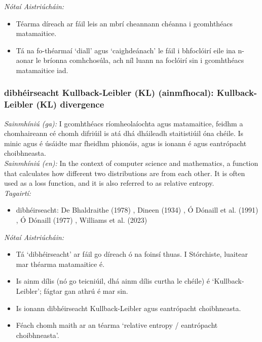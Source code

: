  \noindent \textit{Nótaí Aistriúcháin:}
\begin{itemize}
	\item Téarma díreach ar fáil leis an mbrí cheannann chéanna i gcomhthéacs matamaitice.
	\item Tá na fo-théarmaí `diall' agus `caighdeánach' le fáil i bhfoclóirí eile ina n-aonar le bríonna comhchosúla, ach níl luann na foclóirí sin i gcomhthéacs matamaitice iad.
\end{itemize}


\subsubsection*{dibhéirseacht Kullback-Leibler (KL) (ainmfhocal): Kullback-Leibler (KL) divergence}
 \noindent \textit{Sainmhíniú (ga):} I gcomhthéacs ríomheolaíochta agus matamaitice, feidhm a chomhaireann cé chomh difriúil is atá dhá dháileadh staitistiúil óna chéile. Is minic agus é úsáidte mar fheidhm phionóis, agus is ionann é agus eantrópacht choibhneasta.
\\
 \noindent \textit{Sainmhíniú (en):} In the context of computer science and mathematics, a function that calculates how different two distributions are from each other. It is often used as a loss function, and it is also referred to as relative entropy.
\\
 \noindent \textit{Tagairtí:}
\begin{itemize}
	\item dibhéirseacht: De Bhaldraithe (1978) \cite{de-bhaldraithe}, Dineen (1934) \cite{dineen}, Ó Dónaill et al. (1991) \cite{focloir-beag}, Ó Dónaill (1977) \cite{odonaill}, Williams et al. (2023) \cite{storchiste}
\end{itemize}

 \noindent \textit{Nótaí Aistriúcháin:}
\begin{itemize}
	\item Tá `dibhéirseacht' ar fáil go díreach ó na foinsí thuas. I Stórchiste, luaitear mar théarma matamaitice é.
	\item Is ainm dílis (nó go teicniúil, dhá ainm dílis curtha le chéile) é `Kullback-Leibler'; fágtar gan athrú é mar sin.
	\item Is ionann dibhéirseacht Kullback-Leibler agus eantrópacht choibhneasta.
	\item Féach chomh maith ar an téarma `relative entropy / eantrópacht choibhneasta'.
\end{itemize}


